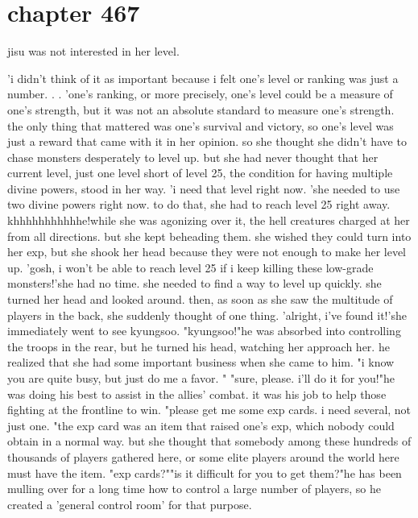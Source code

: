 \section{chapter 467}

jisu was not interested in her level.





'i didn't think of it as important because i felt one's level or ranking was just a number.
.
.
'one's ranking, or more precisely, one's level could be a measure of one's strength, but it was not an absolute standard to measure one's strength.
the only thing that mattered was one's survival and victory, so one's level was just a reward that came with it in her opinion.
 so she thought she didn't have to chase monsters desperately to level up.
but she had never thought that her current level, just one level short of level 25, the condition for having multiple divine powers, stood in her way.
 'i need that level right now.
'she needed to use two divine powers right now.
 to do that, she had to reach level 25 right away.
khhhhhhhhhhhe!while she was agonizing over it, the hell creatures charged at her from all directions.
but she kept beheading them.
 she wished they could turn into her exp, but she shook her head because they were not enough to make her level up.
 'gosh, i won't be able to reach level 25 if i keep killing these low-grade monsters!'she had no time.
 she needed to find a way to level up quickly.
 she turned her head and looked around.
then, as soon as she saw the multitude of players in the back, she suddenly thought of one thing.
 'alright, i've found it!'she immediately went to see kyungsoo.
"kyungsoo!"he was absorbed into controlling the troops in the rear, but he turned his head, watching her approach her.
 he realized that she had some important business when she came to him.
"i know you are quite busy, but just do me a favor.
"
"sure, please.
 i'll do it for you!"he was doing his best to assist in the allies' combat.
 it was his job to help those fighting at the frontline to win.
"please get me some exp cards.
 i need several, not just one.
"the exp card was an item that raised one's exp, which nobody could obtain in a normal way.
 but she thought that somebody among these hundreds of thousands of players gathered here, or some elite players around the world here must have the item.
"exp cards?""is it difficult for you to get them?"he has been mulling over for a long time how to control a large number of players, so he created a 'general control room' for that purpose.
